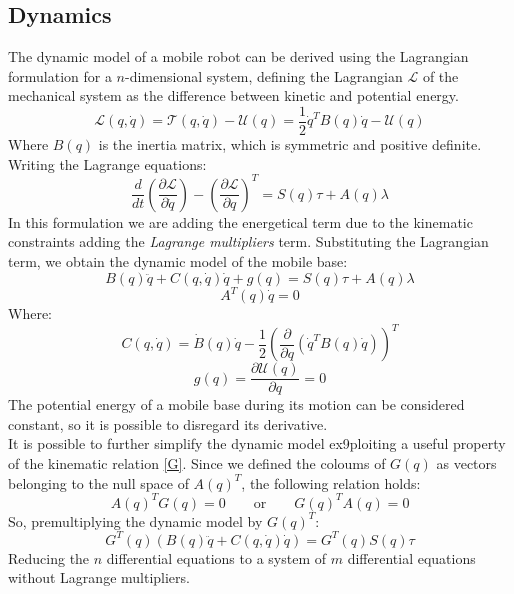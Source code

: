 \subsection{Dynamics}
The dynamic model of a mobile robot can be derived using the Lagrangian formulation for a $n$-dimensional system, defining the Lagrangian $\mathcal{L}$ of the mechanical system as the difference between kinetic and potential energy.
\begin{equation}
\mathcal{L}(q,\dot{q})=\mathcal{T}(q,\dot{q})-\mathcal{U}(q)=\frac{1}{2}\dot{q}^T B(q)\dot{q} - \mathcal{U}(q)
\end{equation}
Where $B(q)$ is the inertia matrix, which is symmetric and positive definite.\\
Writing the Lagrange equations:
\begin{equation}
\frac{d}{dt}\left(\frac{\partial\mathcal{L}}{\partial\dot{q}} \right) - \left(\frac{\partial\mathcal{L}}{\partial q} \right)^T=S(q)\tau+A(q)\lambda
\end{equation}
In this formulation we are adding the energetical term due to the kinematic constraints adding the \textit{Lagrange multipliers} term. 
Substituting the Lagrangian term, we obtain the dynamic model of the mobile base:
\begin{equation}
B(q)\ddot{q}+C(q,\dot{q})\dot{q}+g(q) = S(q)\tau+A(q)\lambda
\end{equation}
\begin{equation*} 
A^T \left( q \right)\dot{q} =0  
\end{equation*}
Where:
\begin{equation}
C(q,\dot{q})=\dot{B}(q)\dot{q}-\frac{1}{2}\left(\frac{\partial}{\partial q}\left( \dot{q}^T B(q)\dot{q}\right)\right)^T
\end{equation}
\begin{equation}
g(q) = \frac{\partial\mathcal{U}(q)}{\partial q} = 0
\end{equation}
The potential energy of a mobile base during its motion can be considered constant, so it is possible to disregard its derivative.\\
It is possible to further simplify the dynamic model ex9ploiting a useful property of the kinematic relation \ref{G}. Since we defined the coloums of $G(q)$ as vectors belonging to the null space of $A(q)^T$, the following relation holds:
\begin{equation}
A(q)^T G(q) = 0 \qquad\textrm{or}\qquad G(q)^T A(q) = 0
\end{equation}
So, premultiplying the dynamic model by $G(q)^T$:
\begin{equation} \label{premultiplicationbyG}
G^T(q)\left(B(q)\ddot{q}+C(q,\dot{q})\dot{q}\right) = G^T(q)S(q)\tau
\end{equation}
Reducing the $n$ differential equations to a system of $m$ differential equations without Lagrange multipliers.
